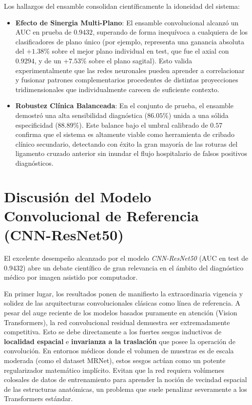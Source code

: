 Los hallazgos del ensamble consolidan científicamente la idoneidad del sistema:
\begin{itemize}
    \item \textbf{Efecto de Sinergia Multi-Plano}: El ensamble convolucional alcanzó un AUC en prueba de $0.9432$, superando de forma inequívoca a cualquiera de los clasificadores de plano único (por ejemplo, representa una ganancia absoluta del $+1.38\%$ sobre el mejor plano individual en test, que fue el axial con $0.9294$, y de un $+7.53\%$ sobre el plano sagital). Esto valida experimentalmente que las redes neuronales pueden aprender a correlacionar y fusionar patrones complementarios procedentes de distintas proyecciones tridimensionales que individualmente carecen de suficiente contexto.
    \item \textbf{Robustez Clínica Balanceada}: En el conjunto de prueba, el ensamble demostró una alta sensibilidad diagnóstica ($86.05\%$) unida a una sólida especificidad ($88.89\%$). Este balance bajo el umbral calibrado de $0.57$ confirma que el sistema es altamente viable como herramienta de cribado clínico secundario, detectando con éxito la gran mayoría de las roturas del ligamento cruzado anterior sin inundar el flujo hospitalario de falsos positivos diagnósticos.
\end{itemize}

\section{Discusión del Modelo Convolucional de Referencia (CNN-ResNet50)}
\label{sec:discusion_resnet50}

El excelente desempeño alcanzado por el modelo \textit{CNN-ResNet50} (AUC en test de $0.9432$) abre un debate científico de gran relevancia en el ámbito del diagnóstico médico por imagen asistido por computador.

En primer lugar, los resultados ponen de manifiesto la extraordinaria vigencia y solidez de las arquitecturas convolucionales clásicas como línea de referencia. A pesar del auge reciente de los modelos basados puramente en atención (Vision Transformers), la red convolucional residual demuestra ser extremadamente competitiva. Esto se debe directamente a los fuertes sesgos inductivos de \textbf{localidad espacial} e \textbf{invarianza a la traslación} que posee la operación de convolución. En entornos médicos donde el volumen de muestras es de escala moderada (como el dataset MRNet), estos sesgos actúan como un potente regularizador matemático implícito. Evitan que la red requiera volúmenes colosales de datos de entrenamiento para aprender la noción de vecindad espacial de las estructuras anatómicas, un problema que suele penalizar severamente a los Transformers estándar.

